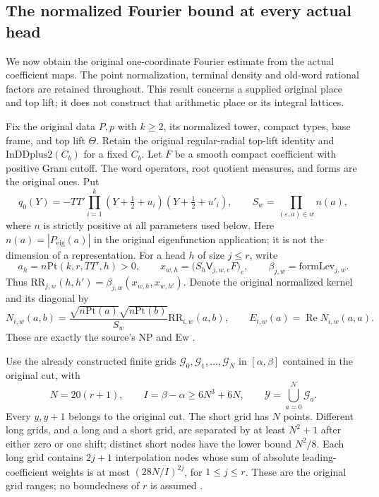 \subsection{The normalized Fourier bound at every actual head}
\label{actual-kernel-fourier}

We now obtain the original one-coordinate Fourier estimate from
the actual coefficient maps.  The point normalization, terminal
density and old-word rational factors are retained throughout.
This result concerns a supplied original place and top lift; it
does not construct that arithmetic place or its integral lattices.

Fix the original data $P,p$ with $k\ge2$, its normalized tower,
compact types, base frame, and top lift $\Theta$.  Retain the
original regular-radial top-lift identity and
$\mathrm{InDDplus2}(C_b)$ for a fixed $C_b$.
Let $F$ be a smooth compact coefficient with positive Gram cutoff.
The word operators, root quotient measures, and forms are the
original ones.  Put
\[
 q_0(Y)=-TT'\prod_{i=1}^k
       (Y+\tfrac12+u_i)(Y+\tfrac12+u'_i),\qquad
 S_w=\prod_{(\varepsilon,a)\in w}n(a),
\]
where $n$ is strictly positive at all parameters used below.
Here $n(a)=|P_{\mathrm{eig}}(a)|$ in the original eigenfunction
application; it is not the dimension of a representation.
For a head $h$ of size $j\le r$, write
\[
 a_h=n\mathrm{Pt}(k,r,TT',h)>0,\qquad
 x_{w,h}=\bigl(S_h\mathsf V_{j,w,e}F\bigr)_e,
 \qquad \beta_{j,w}=\mathrm{formLev}_{j,w}.
\]
Thus $\mathrm{RR}_{j,w}(h,h')=
\beta_{j,w}(x_{w,h},x_{w,h'})$.
Denote the original normalized kernel and its diagonal by
\[
 N_{i,w}(a,b)=\frac{\sqrt{n\mathrm{Pt}(a)}
                          \sqrt{n\mathrm{Pt}(b)}}{S_w}
                       \mathrm{RR}_{i,w}(a,b),\qquad
 E_{i,w}(a)=\operatorname{Re}N_{i,w}(a,a).
\]
These are exactly the source's $\mathrm{NP}$ and $\mathrm{Ew}$
\cite{kernel-fourier-source}.

Use the already constructed finite grids
$\mathcal G_0,\mathcal G_1,\ldots,\mathcal G_N$ in
$[\alpha,\beta]$ contained in the original cut, with
\[
 N=20(r+1),\qquad I=\beta-\alpha\ge6N^3+6N,
 \qquad \mathcal Y=\bigcup_{a=0}^N\mathcal G_a.
\]
Every $y,y+1$ belongs to the original cut.  The short grid
has $N$ points.  Different long grids, and a long and a
short grid, are separated by at least $N^2+1$ after either
zero or one shift; distinct short nodes have the lower bound
$N^2/8$.  Each long grid contains $2j+1$ interpolation
nodes whose sum of absolute leading-coefficient weights is
at most $(28N/I)^{2j}$, for $1\le j\le r$.
These are the original grid ranges; no boundedness of $r$
is assumed \cite{kernel-fourier-established}.

